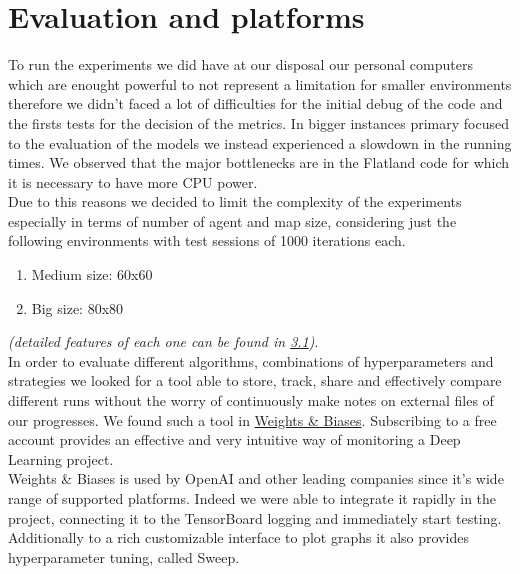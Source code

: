 \section{Evaluation and platforms}
\label{sec:evaluation}
To run the experiments we did have at our disposal our personal computers which are enought powerful to not represent a limitation for smaller environments therefore  we didn't faced a lot of difficulties for the initial debug of the code and the firsts tests for the decision of the metrics. In bigger instances primary focused to the evaluation of the models we instead experienced a slowdown in the running times. We observed that the major bottlenecks are in the Flatland code for which it is necessary to have more CPU power.\\
Due to this reasons we decided to limit the complexity of the experiments especially in terms of number of agent and map size, considering just the following environments with test sessions of 1000 iterations each.
\begin{enumerate}
	\item Medium size: 60x60
	\item Big size: 80x80
\end{enumerate}
\textit{(detailed features of each one can be found in \hyperref[sec:ourParameters]{3.1})}.\\
In order to evaluate different algorithms, combinations of hyperparameters and strategies we looked for a tool able to store, track, share and effectively compare different runs without the worry of continuously make notes on external files of our progresses.
We found such a tool in \href{https://www.wandb.com/}{Weights \& Biases}.
Subscribing to a free account provides an effective and very intuitive way of monitoring a Deep Learning project.\\
Weights \& Biases is used by OpenAI and other leading companies since it's wide range of supported platforms. Indeed we were able to integrate it rapidly in the project, connecting it to the TensorBoard logging and immediately start testing.\\
Additionally to a rich customizable interface to plot graphs it also provides hyperparameter tuning, called Sweep.
